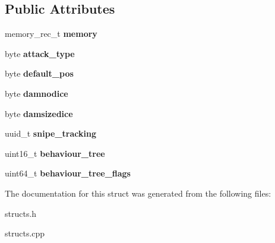 \subsection*{Public Attributes}
\begin{DoxyCompactItemize}
\item 
\mbox{\label{structmob__special__data_a0519f9e36be701941fc758bc8cd8588f}} 
memory\+\_\+rec\+\_\+t {\bfseries memory}
\item 
\mbox{\label{structmob__special__data_a6fed6831bec662865e54b3aed10cd5e7}} 
byte {\bfseries attack\+\_\+type}
\item 
\mbox{\label{structmob__special__data_ab5e5ba5e7e449a683985049435209615}} 
byte {\bfseries default\+\_\+pos}
\item 
\mbox{\label{structmob__special__data_a20fd98b38e546fcaa269a4c39f6bb1de}} 
byte {\bfseries damnodice}
\item 
\mbox{\label{structmob__special__data_af9652f6236ab9cbebf2fba0c001689c1}} 
byte {\bfseries damsizedice}
\item 
\mbox{\label{structmob__special__data_a08d54bf26c10c6f2b287624d822e97a8}} 
uuid\+\_\+t {\bfseries snipe\+\_\+tracking}
\item 
\mbox{\label{structmob__special__data_a231979d3eefd32373b1eed1135e6bdde}} 
uint16\+\_\+t {\bfseries behaviour\+\_\+tree}
\item 
\mbox{\label{structmob__special__data_add663891189bbac8c9eddc85bc2d333b}} 
uint64\+\_\+t {\bfseries behaviour\+\_\+tree\+\_\+flags}
\end{DoxyCompactItemize}


The documentation for this struct was generated from the following files\+:\begin{DoxyCompactItemize}
\item 
structs.\+h\item 
structs.\+cpp\end{DoxyCompactItemize}
